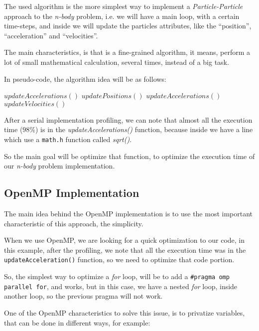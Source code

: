 
The used algorithm is the more simplest
way to implement a \emph{Particle-Particle}
approach to the \emph{n-body} problem,
i.e. we will have a main loop, with a certain
time-steps, and inside we will update the
particles attributes, like the ``position'',
``acceleration'' and ``velocities''.

The main characteristics,
is that is a fine-grained algorithm,
it means, perform a lot of small
mathematical calculation, several times,
instead of a big task.

In pseudo-code, the algorithm idea will be
as follows:

\begin{center}
\begin{algorithmic}
\STATE $updateAccelerations()$
    \STATE $updatePositions()$
    \STATE $updateAccelerations()$
    \STATE $updateVelocities()$
\ENDFOR 
\end{algorithmic}
\end{center}

After a serial implementation profiling,
we can note that almost all the execution time ($98\%$)
is in the \emph{updateAccelerations()} function,
because inside we have a line which use a \texttt{math.h}
function called \emph{sqrt()}.

So the main goal will be optimize that function,
to optimize the execution time of our \emph{n-body} problem
implementation.

\subsection{OpenMP Implementation}
 
The main idea behind the OpenMP implementation
is to use the most important characteristic of this approach,
the simplicity.

When we use OpenMP, we are looking for a quick
optimization to our code, in this example,
after the profiling, we note that all the execution
time was in the \texttt{updateAcceleration()} function,
so we need to optimize that code portion.

So, the simplest way to optimize a \emph{for} loop,
will be to add a \texttt{\#pragma omp parallel for},
and works, but in this case, we have a nested \emph{for} loop,
inside another loop, so the previous pragma will not work.

One of the OpenMP characteristics to solve this issue,
is to privatize variables, that can be done in different ways,
for example:

